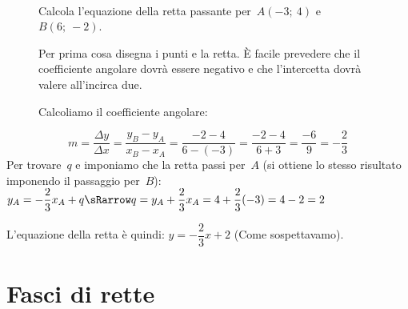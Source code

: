  \begin{esempio}
~

\begin{inaccessibleblock}
 \begin{figure}[h]
\centering \hspace{-5mm}
 \begin{minipage}[]{.40\textwidth}
Calcola l'equazione della retta passante per~\(A(-3;~4)\) e~\(B(6;~-2)\).

\vspace{1em}
Per prima cosa disegna i punti e la retta. È facile prevedere che il 
coefficiente angolare dovrà essere negativo e che l'intercetta dovrà valere
all'incirca due.

\vspace{1em}
Calcoliamo il coefficiente angolare:
 \end{minipage}
 \begin{minipage}[]{.60\textwidth}
   \centering \rettac
 \end{minipage}
\label{fig:rettac}
\end{figure}
\end{inaccessibleblock}
\[m = \frac{\Delta y}{\Delta x} = \frac{y_B - y_A}{x_B - x_A} =
      \frac{-2 - 4}{6 -(-3)} = \frac{-2 - 4}{6 + 3} = \frac{-6}{9} = 
      - \frac{2}{3}
\]
Per trovare~\(q\) e imponiamo che la retta passi per~\(A\) 
(si ottiene lo stesso risultato imponendo il passaggio per~\(B\)): \quad
\(y_A = - \dfrac{2}{3} x_A + q \sRarrow 
    q = y_A +\dfrac{2}{3} x_A = 4 +\dfrac{2}{3} (-3) = 4 - 2 = 2\)

\noindent L'equazione della retta è quindi: \quad
\(y = - \dfrac{2}{3} x + 2\) \quad
(Come sospettavamo).
 \end{esempio}

% 


\section{Fasci di rette}
\label{sec:retta_fasci}

